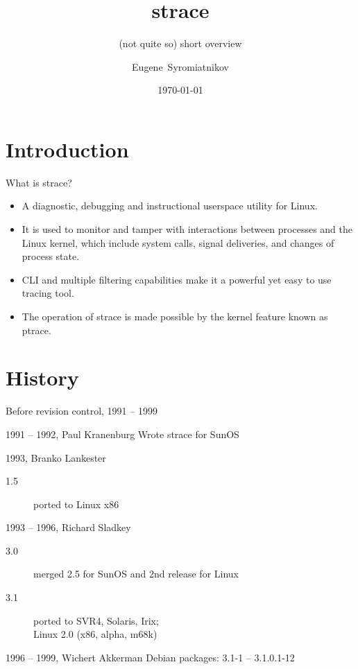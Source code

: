 \documentclass[unicode,aspectratio=169]{beamer}
\title{\Huge strace}
\subtitle{(not quite so) short overview}
\author{Eugene~Syromiatnikov}
\date{\today}
\begin{document}
\begin{frame}
	\titlepage
\end{frame}


\section{Introduction}

\begin{frame}[fragile]{What is strace?}
\begin{itemize}
	\item A diagnostic, debugging and instructional userspace
	utility for Linux.

	\item It is used to monitor and tamper with interactions between
	processes and the Linux kernel, which include system calls, signal
	deliveries, and changes of process state.

	\item CLI and multiple filtering capabilities make it a powerful
	yet easy to use tracing tool.

	\item The operation of strace is made possible by the kernel feature
	known as ptrace.
\end{itemize}
\end{frame}

\section{History}

\begin{frame}{Before revision control, 1991 -- 1999}
	\begin{block}{1991 -- 1992, Paul Kranenburg}
	Wrote strace for SunOS
	\end{block}
	\begin{block}{1993, Branko Lankester}
	\begin{description}
		\item[1.5] ported to Linux x86
	\end{description}
	\end{block}
	\begin{block}{1993 -- 1996, Richard Sladkey}
	\begin{description}
		\item[3.0] merged 2.5 for SunOS and 2nd release for Linux
		\item[3.1] ported to SVR4, Solaris, Irix; \\ Linux 2.0 (x86, alpha, m68k)
	\end{description}
	\end{block}
	\begin{block}{1996 -- 1999, Wichert Akkerman}
		Debian packages: 3.1-1 -- 3.1.0.1-12
	\end{block}
\end{frame}
\end{document}
